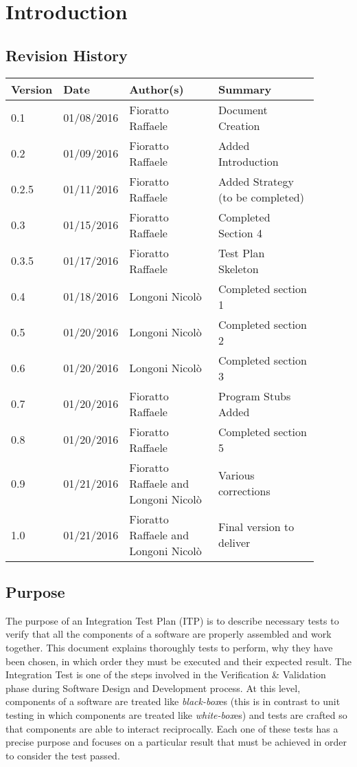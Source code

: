 \newpage
\section{Introduction}
\subsection{Revision History}
\begin{table}[H]
	\centering
	\begin{tabular*}{\linewidth}{|p{0.1\linewidth}|p{0.13\linewidth}|p{0.3099\linewidth}|p{0.3499\linewidth}|}
		\hline
		\textbf{Version} & \textbf{Date}       & \textbf{Author(s)}         & \textbf{Summary}           \\ \hline
		0.1     & 01/08/2016 & Fioratto Raffaele & Document Creation \\ \hline
		0.2		& 01/09/2016 & Fioratto Raffaele & Added Introduction \\ \hline
		0.2.5	& 01/11/2016 & Fioratto Raffaele & Added Strategy (to be completed) \\ \hline 
		0.3		& 01/15/2016 & Fioratto Raffaele & Completed Section 4 \\ \hline
		0.3.5	& 01/17/2016 & Fioratto Raffaele & Test Plan Skeleton \\ \hline
		0.4 	& 01/18/2016 & Longoni Nicol\`{o} & Completed section 1 \\ \hline
		0.5 	& 01/20/2016 & Longoni Nicol\`{o} & Completed section 2 \\ \hline
		0.6 	& 01/20/2016 & Longoni Nicol\`{o} & Completed section 3 \\ \hline
		0.7 & 01/20/2016 & Fioratto Raffaele & Program Stubs Added \\ \hline
		0.8 	& 01/20/2016 & Fioratto Raffaele & Completed section 5 \\ \hline
		0.9 	& 01/21/2016 & Fioratto Raffaele and Longoni Nicol\`{o} & Various corrections \\ \hline
		1.0 	& 01/21/2016 & Fioratto Raffaele and Longoni Nicol\`{o} & Final version to deliver \\ \hline
	\end{tabular*}
\end{table}
\break
\subsection{Purpose}
The purpose of an Integration Test Plan (ITP) is to describe necessary tests to verify that all the components of a software are properly assembled and work together. This document explains thoroughly tests to perform, why they have been chosen, in which order they must be executed and their expected result. The Integration Test is one of the steps involved in the Verification \& Validation phase during Software Design and Development process. At this level, components of a software are treated like \textit{black-box}es (this is in contrast to unit testing in which components are treated like \textit{white-box}es) and tests are crafted so that components are able to interact reciprocally. Each one of these tests has a precise purpose and focuses on a particular result that must be achieved in order to consider the test passed.

